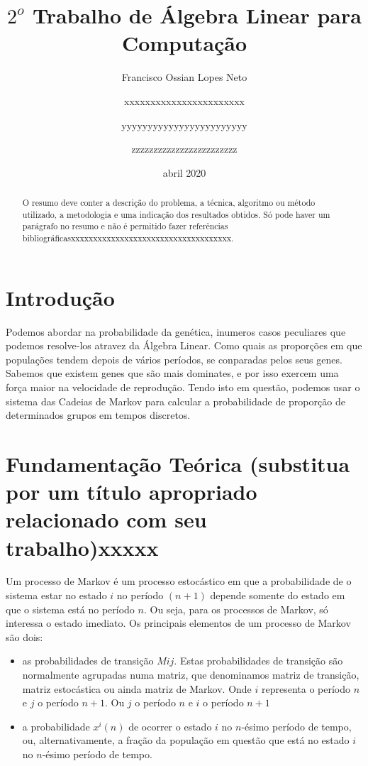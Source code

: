 \documentclass[a4paper,12pt]{article}
\title{$2^o$ Trabalho de Álgebra Linear para Computação}
\author{
  Francisco Ossian Lopes Neto\\
  \and
  xxxxxxxxxxxxxxxxxxxxxxx\\
  \and
  yyyyyyyyyyyyyyyyyyyyyyyy\\
  \and
  zzzzzzzzzzzzzzzzzzzzzzzz\\
  \and
}
\date{abril 2020}
\begin{document}
\maketitle

\begin{abstract}
O resumo deve conter a descrição do problema, a técnica, algoritmo ou método utilizado, a metodologia e uma indicação dos resultados obtidos. Só pode haver um parágrafo no resumo e não é permitido fazer referências bibliográficasxxxxxxxxxxxxxxxxxxxxxxxxxxxxxxxxxxxx.
\end{abstract}


\section{Introdução}
\label{sec:introducao}

Podemos abordar na probabilidade da genética, inumeros casos peculiares que podemos resolve-los atravez da Álgebra Linear. Como quais as proporções em que populações tendem depois de vários períodos, se conparadas pelos seus genes. Sabemos que existem genes que são mais dominates, e por isso exercem uma força maior na velocidade de reprodução. Tendo isto em questão, podemos usar o sistema das Cadeias de Markov para calcular a probabilidade de proporção de determinados grupos em tempos discretos. 


\section{Fundamentação Teórica (substitua por um título apropriado relacionado com seu trabalho)xxxxx}
\label{sec:fundamentacao}

Um processo de Markov é um processo estocástico em que a probabilidade de o sistema estar no estado $i$ no período $(n+1)$ depende somente do estado em que o sistema está no período $n$. Ou seja, para os processos de Markov, só interessa o estado imediato. Os principais elementos de um processo de Markov são dois:

\begin{itemize}

\item as probabilidades de transição $Mij$. Estas probabilidades de transição são normalmente agrupadas numa matriz, que denominamos matriz de transição, matriz estocástica ou ainda matriz de Markov. Onde $i$ representa o período $n$ e $j$ o período $n+1$. Ou $j$ o período $n$ e $i$ o período $n+1$

\item a probabilidade $x^i(n)$ de ocorrer o estado $i$ no $n$-ésimo período de tempo, ou, alternativamente, a fração da população em questão que está no estado $i$ no $n$-ésimo período de tempo.

\end{itemize}
\end{document}
